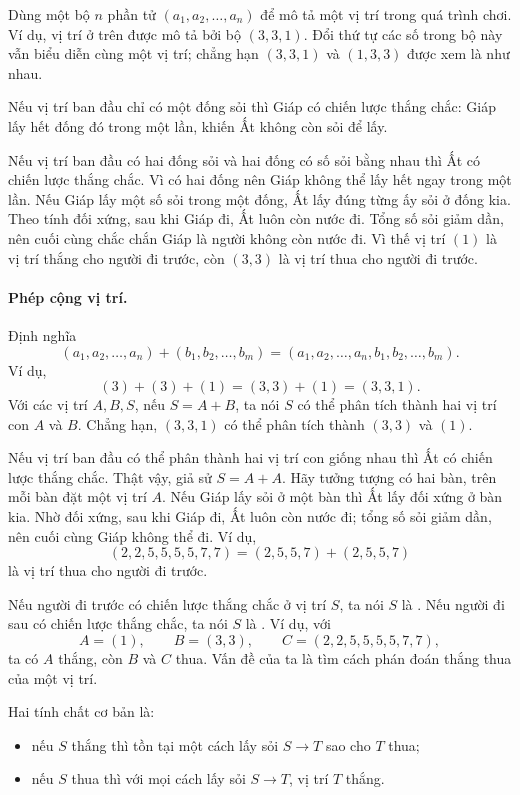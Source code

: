 \documentclass[11pt]{article}
\begin{document}
Dùng một bộ \(n\) phần tử \((a_1,a_2,\ldots,a_n)\) để mô tả một vị trí trong
quá trình chơi. Ví dụ, vị trí ở trên được mô tả bởi bộ
\((3,3,1)\). Đổi thứ tự các số trong bộ này vẫn biểu diễn cùng một vị trí;
chẳng hạn \((3,3,1)\) và \((1,3,3)\) được xem là như nhau.

Nếu vị trí ban đầu chỉ có một đống sỏi thì Giáp có chiến lược thắng chắc:
Giáp lấy hết đống đó trong một lần, khiến Ất không còn sỏi để lấy.

Nếu vị trí ban đầu có hai đống sỏi và hai đống có số sỏi bằng nhau thì Ất có
chiến lược thắng chắc. Vì có hai đống nên Giáp không thể lấy hết ngay trong
một lần. Nếu Giáp lấy một số sỏi trong một đống, Ất lấy đúng từng ấy sỏi ở
đống kia. Theo tính đối xứng, sau khi Giáp đi, Ất luôn còn nước đi. Tổng số
sỏi giảm dần, nên cuối cùng chắc chắn Giáp là người không còn nước đi. Vì
thế vị trí \((1)\) là vị trí thắng cho người đi trước, còn \((3,3)\) là vị
trí thua cho người đi trước.

\paragraph{Phép cộng vị trí.}
Định nghĩa
\[
  (a_1,a_2,\ldots,a_n)+(b_1,b_2,\ldots,b_m)
  =(a_1,a_2,\ldots,a_n,b_1,b_2,\ldots,b_m).
\]
Ví dụ,
\[
  (3)+(3)+(1)=(3,3)+(1)=(3,3,1).
\]
Với các vị trí \(A,B,S\), nếu \(S=A+B\), ta nói \(S\) có thể phân tích thành
hai vị trí con \(A\) và \(B\). Chẳng hạn, \((3,3,1)\) có thể phân tích thành
\((3,3)\) và \((1)\).

Nếu vị trí ban đầu có thể phân thành hai vị trí con giống nhau thì Ất có
chiến lược thắng chắc. Thật vậy, giả sử \(S=A+A\). Hãy tưởng tượng có hai
bàn, trên mỗi bàn đặt một vị trí \(A\). Nếu Giáp lấy sỏi ở một bàn thì Ất
lấy đối xứng ở bàn kia. Nhờ đối xứng, sau khi Giáp đi, Ất luôn còn nước đi;
tổng số sỏi giảm dần, nên cuối cùng Giáp không thể đi. Ví dụ,
\[
  (2,2,5,5,5,5,7,7)=(2,5,5,7)+(2,5,5,7)
\]
là vị trí thua cho người đi trước.

Nếu người đi trước có chiến lược thắng chắc ở vị trí \(S\), ta nói \(S\) là
. Nếu người đi sau có chiến lược thắng chắc, ta nói \(S\)
là . Ví dụ, với
\[
  A=(1),\qquad B=(3,3),\qquad C=(2,2,5,5,5,5,7,7),
\]
ta có \(A\) thắng, còn \(B\) và \(C\) thua. Vấn đề của ta là tìm cách phán
đoán thắng thua của một vị trí.

Hai tính chất cơ bản là:
\begin{itemize}
  \item nếu \(S\) thắng thì tồn tại một cách lấy sỏi \(S\to T\) sao cho
  \(T\) thua;
  \item nếu \(S\) thua thì với mọi cách lấy sỏi \(S\to T\), vị trí \(T\)
  thắng.
\end{itemize}
\end{document}
